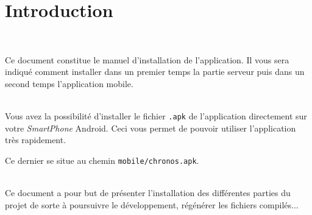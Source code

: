 \chapter*{Introduction}
\thispagestyle{plain}
~\\[1cm]
{ \large

Ce document constitue le manuel d'installation de l'application. Il vous sera indiqué
comment installer dans un premier temps la partie serveur puis dans un second temps l'application mobile.

~\\\indent
Vous avez la possibilité d'installer le fichier \texttt{.apk} de l'application directement sur votre \emph{SmartPhone} Android. Ceci vous permet de pouvoir utiliser l'application très rapidement.

Ce dernier se situe au chemin \texttt{mobile/chronos.apk}.

~\\\indent
Ce document a pour but de présenter l'installation des différentes parties du projet de sorte à poursuivre le développement, régénérer les fichiers compilés...
}
